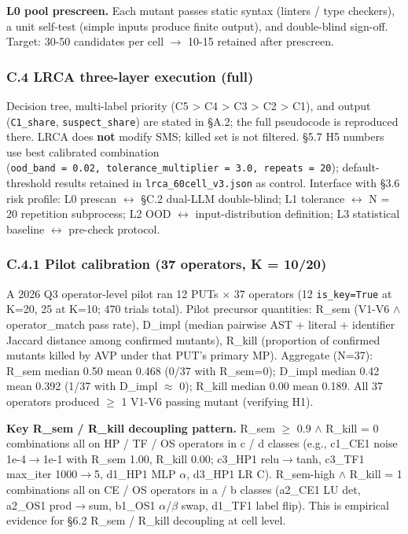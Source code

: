 \documentclass[review,12pt,authoryear]{elsarticle}
\begin{document}
\textbf{L0 pool prescreen.} Each mutant passes static syntax (linters /
type checkers), a unit self-test (simple inputs produce finite output),
and double-blind sign-off. Target: 30-50 candidates per cell $\to$ 10-15
retained after prescreen.

\subsubsection{C.4 LRCA three-layer execution
(full)}\label{c.4-lrca-three-layer-execution-full}

Decision tree, multi-label priority (C5 \textgreater{} C4 \textgreater{}
C3 \textgreater{} C2 \textgreater{} C1), and output (\texttt{C1\_share},
\texttt{suspect\_share}) are stated in §A.2; the full pseudocode is
reproduced there. LRCA does \textbf{not} modify SMS; killed set is not
filtered. §5.7 H5 numbers use best calibrated combination
(\texttt{ood\_band\ =\ 0.02,\ tolerance\_multiplier\ =\ 3.0,\ repeats\ =\ 20});
default-threshold results retained in \texttt{lrca\_60cell\_v3.json} as
control. Interface with §3.6 risk profile: L0 prescan $\leftrightarrow$ §C.2 dual-LLM
double-blind; L1 tolerance $\leftrightarrow$ N = 20 repetition subprocess; L2 OOD $\leftrightarrow$
input-distribution definition; L3 statistical baseline $\leftrightarrow$ pre-check
protocol.

\subsubsection{C.4.1 Pilot calibration (37 operators, K =
10/20)}\label{c.4.1-pilot-calibration-37-operators-k-1020}

A 2026 Q3 operator-level pilot ran 12 PUTs $\times$ 37 operators (12
\texttt{is\_key=True} at K=20, 25 at K=10; 470 trials total). Pilot
precursor quantities: R\_sem (V1-V6 $\wedge$ operator\_match pass rate),
D\_impl (median pairwise AST + literal + identifier Jaccard distance
among confirmed mutants), R\_kill (proportion of confirmed mutants
killed by AVP under that PUT's primary MP). Aggregate (N=37): R\_sem
median 0.50 mean 0.468 (0/37 with R\_sem=0); D\_impl median 0.42 mean
0.392 (1/37 with D\_impl $\approx$ 0); R\_kill median 0.00 mean 0.189. All 37
operators produced $\geq$ 1 V1-V6 passing mutant (verifying H1).

\textbf{Key R\_sem / R\_kill decoupling pattern.} R\_sem $\geq$ 0.9 $\wedge$ R\_kill
= 0 combinations all on HP / TF / OS operators in c / d classes (e.g.,
c1\_CE1 noise 1e-4$\to$1e-1 with R\_sem 1.00, R\_kill 0.00; c3\_HP1
relu$\to$tanh, c3\_TF1 max\_iter 1000$\to$5, d1\_HP1 MLP $\alpha$, d3\_HP1 LR C).
R\_sem-high $\wedge$ R\_kill = 1 combinations all on CE / OS operators in a / b
classes (a2\_CE1 LU det, a2\_OS1 prod$\to$sum, b1\_OS1 $\alpha$/$\beta$ swap, d1\_TF1
label flip). This is empirical evidence for §6.2 R\_sem / R\_kill
decoupling at cell level.
\end{document}
